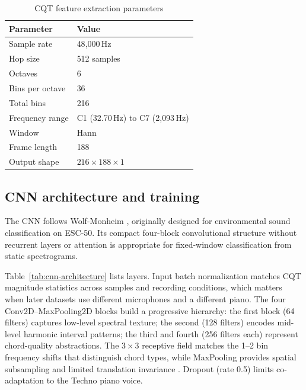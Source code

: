 \documentclass[pdflatex,sn-mathphys-num,iicol]{sn-jnl}
\theoremstyle{thmstyleone}
\theoremstyle{thmstyletwo}
\theoremstyle{thmstylethree}
\begin{document}
\begin{table}[t]
\caption{CQT feature extraction parameters}\label{tab:cqt-extraction-params}
\begin{tabular}{@{}ll@{}}
\toprule
Parameter & Value \\
\midrule
Sample rate & 48{,}000\,Hz \\
Hop size & 512 samples \\
Octaves & 6 \\
Bins per octave & 36 \\
Total bins & 216 \\
Frequency range & C1 (32.70\,Hz) to C7 (2{,}093\,Hz) \\
Window & Hann \\
Frame length & 188 \\
Output shape & $216 \times 188 \times 1$ \\
\bottomrule
\end{tabular}
\end{table}

\subsection{CNN architecture and training}\label{subsec3_3}

The CNN follows Wolf-Monheim \cite{Wolf-Monheim2025}, originally designed for environmental sound classification on ESC-50. Its compact four-block convolutional structure without recurrent layers or attention is appropriate for fixed-window classification from static spectrograms.

Table~\ref{tab:cnn-architecture} lists layers. Input batch normalization matches CQT magnitude statistics across samples and recording conditions, which matters when later datasets use different microphones and a different piano. The four Conv2D--MaxPooling2D blocks build a progressive hierarchy: the first block (64 filters) captures low-level spectral texture; the second (128 filters) encodes mid-level harmonic interval patterns; the third and fourth (256 filters each) represent chord-quality abstractions. The $3\times3$ receptive field matches the 1--2 bin frequency shifts that distinguish chord types, while MaxPooling provides spatial subsampling and limited translation invariance \cite{Purwono2022}. Dropout (rate 0.5) limits co-adaptation to the Techno piano voice.
\end{document}
